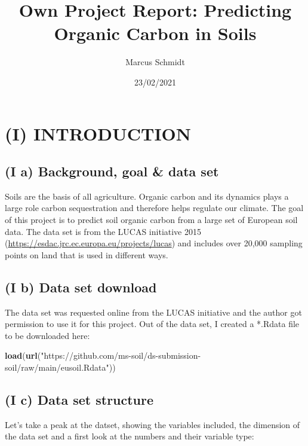 \documentclass[
]{article}
\title{Own Project Report: Predicting Organic Carbon in Soils}
\author{Marcus Schmidt}
\date{23/02/2021}
\newenvironment{Shaded}{\begin{snugshade}}{\end{snugshade}}
\newcommand{\KeywordTok}[1]{\textcolor[rgb]{0.13,0.29,0.53}{\textbf{#1}}}
\newcommand{\NormalTok}[1]{#1}
\newcommand{\StringTok}[1]{\textcolor[rgb]{0.31,0.60,0.02}{#1}}
\begin{document}
\maketitle

\hypertarget{i-introduction}{%
\section{(I) INTRODUCTION}\label{i-introduction}}

\hypertarget{i-a-background-goal-data-set}{%
\subsection{(I a) Background, goal \& data
set}\label{i-a-background-goal-data-set}}

Soils are the basis of all agriculture. Organic carbon and its dynamics
plays a large role carbon sequestration and therefore helps regulate our
climate. The goal of this project is to predict soil organic carbon from
a large set of European soil data. The data set is from the LUCAS
initiative 2015 (\url{https://esdac.jrc.ec.europa.eu/projects/lucas})
and includes over 20,000 sampling points on land that is used in
different ways.

\hypertarget{i-b-data-set-download}{%
\subsection{(I b) Data set download}\label{i-b-data-set-download}}

The data set was requested online from the LUCAS initiative and the
author got permission to use it for this project. Out of the data set, I
created a *.Rdata file to be downloaded here:

\begin{Shaded}
\begin{Highlighting}[]
\KeywordTok{load}\NormalTok{(}\KeywordTok{url}\NormalTok{(}\StringTok{"https://github.com/ms{-}soil/ds{-}submission{-}soil/raw/main/eusoil.Rdata"}\NormalTok{))}
\end{Highlighting}
\end{Shaded}

\hypertarget{i-c-data-set-structure}{%
\subsection{(I c) Data set structure}\label{i-c-data-set-structure}}

Let's take a peak at the datset, showing the variables included, the
dimension of the data set and a first look at the numbers and their
variable type:
\end{document}
